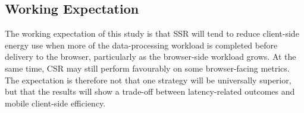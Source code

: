 \subsection*{Working Expectation}

The working expectation of this study is that SSR will tend to reduce client-side energy use when more of the data-processing workload is completed before delivery to the browser, particularly as the browser-side workload grows. At the same time, CSR may still perform favourably on some browser-facing metrics. The expectation is therefore not that one strategy will be universally superior, but that the results will show a trade-off between latency-related outcomes and mobile client-side efficiency.
